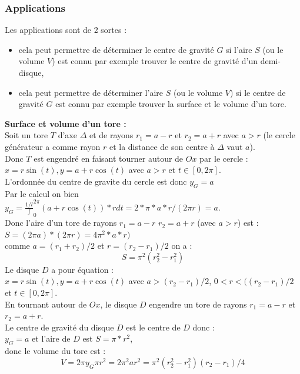 \documentclass[a4paper,11pt]{book}
\begin{document}
\subsubsection{Applications}
Les applications sont de 2 sortes :
\begin{itemize}
\item cela peut permettre de d\'eterminer le centre de gravit\'e $G$ si l'aire
$S$ (ou le volume $V$) est connu par exemple trouver le centre de gravit\'e 
d'un demi-disque,
\item cela peut permettre de d\'eterminer l'aire $S$ (ou le volume $V$) si le 
centre de gravit\'e $G$  est connu par exemple trouver la surface et le volume 
d'un tore.
\end{itemize}
{\bf Surface et volume d'un tore :}\\
Soit un tore $T$ d'axe  $\Delta$ et de rayons $r_1=a-r$ et $r_2=a+r$ avec $a>r$ 
(le cercle g\'en\'erateur a comme rayon $r$ et la distance de son centre \`a $\Delta$ vaut $a$).\\
Donc $T$ est engendr\'e en faisant tourner autour de $Ox$ par le cercle :\\
$x=r\sin(t),y=a+r\cos(t)$ avec $a>r$ et $t\in [0,2\pi]$.\\
L'ordonn\'ee du centre de gravite du cercle est donc  $y_G=a$ \\ 
Par le calcul on bien \\
$y_G=\frac{1/l}\int_0^{2\pi}(a+r\cos(t))*rdt=2*\pi*a*r/(2\pi r)=a$.\\
Donc l'aire d'un tore de rayons $r_1=a-r$ $r_2=a+r$ (avec $a>r$)  est :\\
$S=(2\pi a)*(2\pi r)= 4\pi^2*a*r)$\\
comme $a=(r_1+r_2)/2$ et $r=(r_2-r_1)/2$ on a :
$$S=\pi^2(r_2^2-r_1^2)$$
Le disque $D$ a pour \'equation :\\
$x=r\sin(t),y=a+r\cos(t)$ avec $a>(r_2-r_1)/2$, $0<r<((r_2-r_1)/2$ et $t\in [0,2\pi]$.\\

En tournant autour de $Ox$, le disque $D$  engendre un tore de rayons 
$r_1=a-r$ et $r_2=a+r$.\\
 Le centre de gravit\'e du disque $D$ est le centre de $D$
donc : \\
$y_G=a$ et l'aire de $D$ est $S=\pi*r^2$,\\
 donc le volume du tore est :
$$V=2\pi y_G \pi r^2=2\pi^2ar^2=\pi^2(r_2^2-r_1^2)(r_2-r_1)/4$$
\end{document}
